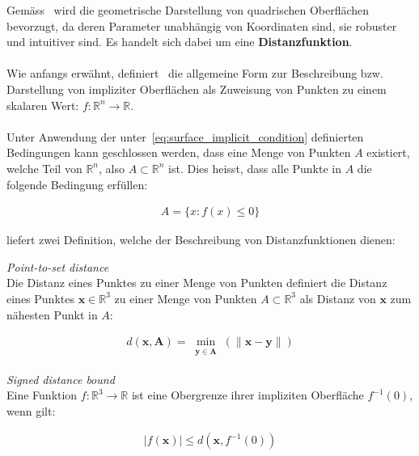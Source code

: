 Gemäss~\cite{hart_sphere_1994} wird die geometrische Darstellung von
quadrischen Oberflächen bevorzugt, da deren Parameter unabhängig von
Koordinaten sind, sie robuster und intuitiver sind. Es handelt sich dabei um
eine \textbf{Distanzfunktion}.\\
\\
Wie anfangs erwähnt, definiert~\cite{hart_sphere_1994} die allgemeine Form zur
Beschreibung bzw. Darstellung von impliziter Oberflächen als Zuweisung von
Punkten zu einem skalaren Wert: $ f : \mathbb{R}^{n} \to \mathbb{R} $.\\
\\
Unter Anwendung der unter~\ref{eq:surface_implicit_condition} definierten
Bedingungen kann geschlossen werden, dass eine Menge von Punkten $A$ existiert,
welche Teil von $\mathbb{R}^{n}$, also $A \subset \mathbb{R}^{n}$ ist. Dies heisst, dass alle Punkte in $A$ die folgende Bedingung erfüllen:

\begin{gather}
    A = \{ x : f(x) \leq 0 \}
\end{gather}

\cite{hart_sphere_1994} liefert zwei Definition, welche der Beschreibung von Distanzfunktionen dienen:

\theoremstyle{definition}
\begin{definition}{\label{theo:point_to_set_distance}
    \textit{Point-to-set distance}}\\
    Die Distanz eines Punktes zu einer Menge von Punkten definiert die Distanz
    eines Punktes $ \bm{x} \in \mathbb{R}^{3} $ zu einer Menge von Punkten $A
    \subset \mathbb{R}^{3}$ als Distanz von $\bm{x}$ zum nähesten Punkt in $A$:

    \begin{gather}
        d(\bm{x}, \bm{A}) = \min_{\substack{\bm{y} \in \bm{A}}}(\|\bm{x} - \bm{y}\|)
    \end{gather}
\end{definition}

\theoremstyle{definition}
\begin{definition}{\label{theo:signed_distnace_bound}
    \textit{Signed distance bound}}\\ 
    Eine Funktion $ f : \mathbb{R}^{3} \to \mathbb{R} $ ist eine Obergrenze
    ihrer impliziten Oberfläche $ f^{-1}(0)$, wenn gilt:

    \begin{gather}\label{eq:signed_distnace_bound}
        |f(\bm{x})| \leq d(\bm{x}, f^{-1}(0))
    \end{gather}
\end{definition}

